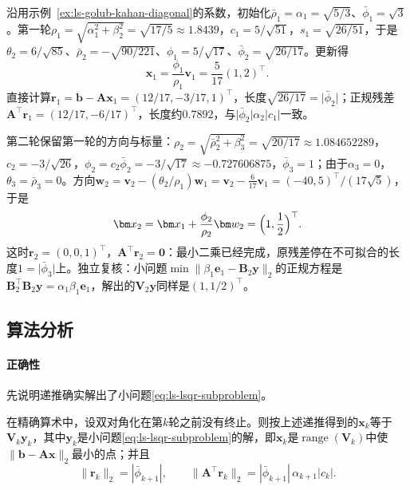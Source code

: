 \begin{example}[不相容矩形系统上的LSQR]
\label{ex:ls-lsqr-diagonal}
沿用示例~\ref{ex:ls-golub-kahan-diagonal}的系数，初始化$\bar\rho_1=\alpha_1=\sqrt{5/3}$、$\bar\phi_1=\sqrt3$。第一轮$\rho_1=\sqrt{\alpha_1^2+\beta_2^2}=\sqrt{17/5}\approx1.8439$，$c_1=5/\sqrt{51}$，$s_1=\sqrt{26/51}$，于是$\theta_2=6/\sqrt{85}$、$\bar\rho_2=-\sqrt{90/221}$、$\phi_1=5/\sqrt{17}$、$\bar\phi_2=\sqrt{26/17}$。更新得
\[
 \bm x_1=\frac{\phi_1}{\rho_1}\bm v_1=\frac5{17}(1,2)^\top .
\]
直接计算$\bm r_1=\bm b-\bm A\bm x_1=(12/17,-3/17,1)^\top$，长度$\sqrt{26/17}=\lvert\bar\phi_2\rvert$；正规残差$\bm A^\top\bm r_1=(12/17,-6/17)^\top$，长度约$0.7892$，与$\lvert\bar\phi_2\rvert\alpha_2\lvert c_1\rvert$一致。

第二轮保留第一轮的方向与标量：$\rho_2=\sqrt{\bar\rho_2^2+\beta_3^2}=\sqrt{20/17}\approx1.084652289$，$c_2=-3/\sqrt{26}$，$\phi_2=c_2\bar\phi_2=-3/\sqrt{17}\approx-0.727606875$，$\bar\phi_3=1$；由于$\alpha_3=0$，$\theta_3=\bar\rho_3=0$。方向$\bm w_2=\bm v_2-(\theta_2/\rho_1)\bm w_1=\bm v_2-\tfrac6{17}\bm v_1=(-40,5)^\top/(17\sqrt5)$，于是
\[
 \bm x_2=\bm x_1+\frac{\phi_2}{\rho_2}\bm w_2=\Bigl(1,\frac12\Bigr)^\top .
\]
这时$\bm r_2=(0,0,1)^\top$，$\bm A^\top\bm r_2=\bm0$：最小二乘已经完成，原残差停在不可拟合的长度$1=\lvert\bar\phi_3\rvert$上。独立复核：小问题$\min\lVert\beta_1\bm e_1-\bm B_2\bm y\rVert_2$的正规方程是$\bm B_2^\top\bm B_2\bm y=\alpha_1\beta_1\bm e_1$，解出的$\bm V_2\bm y$同样是$(1,1/2)^\top$。
\end{example}

\subsection{算法分析}

\paragraph{正确性}
先说明递推确实解出了小问题\eqref{eq:ls-lsqr-subproblem}。

\begin{theorem}[LSQR递推的正确性]
\label{thm:ls-lsqr-recursion}
在精确算术中，设双对角化在第$k$轮之前没有终止。则按上述递推得到的$\bm x_k$等于$\bm V_k\bm y_k$，其中$\bm y_k$是小问题\eqref{eq:ls-lsqr-subproblem}的解，即$\bm x_k$是$\operatorname{range}(\bm V_k)$中使$\lVert\bm b-\bm A\bm x\rVert_2$最小的点；并且
\[
 \lVert\bm r_k\rVert_2=|\bar\phi_{k+1}|,\qquad
 \lVert\bm A^\top\bm r_k\rVert_2=|\bar\phi_{k+1}|\,\alpha_{k+1}|c_k| .
\]
\end{theorem}

